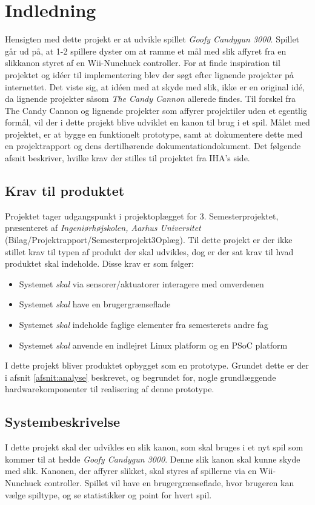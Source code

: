 \chapter{Indledning}
Hensigten med dette projekt er at udvikle spillet \textit{Goofy Candygun 3000}. Spillet går ud på, at 1-2 spillere dyster om at ramme et mål med slik affyret fra en slikkanon styret af en Wii-Nunchuck controller. For at finde inspiration til projektet og idéer til implementering blev der søgt efter lignende projekter på internettet. Det viste sig, at idéen med at skyde med slik, ikke er en original idé, da lignende projekter såsom \textit{The Candy Cannon} \cite{CandyCannon} allerede findes. Til forskel fra The Candy Cannon og lignende projekter som affyrer projektiler uden et egentlig formål, vil der i dette projekt blive udviklet en kanon til brug i et spil. 
Målet med projektet, er at bygge en funktionelt prototype, samt at dokumentere dette med en projektrapport og dens dertilhørende dokumentationdokument. 
Det følgende afsnit beskriver, hvilke krav der stilles til projektet fra IHA's side.

\section{Krav til produktet}
Projektet tager udgangspunkt i projektoplægget for 3. Semesterprojektet, præsenteret af \textit{Ingeniørhøjskolen, Aarhus Universitet} (Bilag/Projektrapport/Semesterprojekt3Oplæg). Til dette projekt er der ikke stillet krav til typen af produkt der skal udvikles, dog er der sat krav til hvad produktet skal indeholde. Disse krav er som følger:

\begin{itemize}
	\item{Systemet \textit{skal} via sensorer/aktuatorer interagere med omverdenen}
	\item{Systemet \textit{skal} have en brugergrænseflade}
	\item{Systemet \textit{skal} indeholde faglige elementer fra semesterets andre fag}
	\item{Systemet \textit{skal} anvende en indlejret Linux platform og en PSoC platform}
\end{itemize}

\noindent I dette projekt bliver produktet opbygget som en prototype. Grundet dette er der i afsnit \ref{afsnit:analyse} beskrevet, og begrundet for, nogle grundlæggende hardwarekomponenter til realisering af denne prototype.


\section{Systembeskrivelse}
\label{afsnit:systembeskrivelse}
I dette projekt skal der udvikles en slik kanon, som skal bruges i et nyt spil som kommer til at hedde \textit{Goofy Candygun 3000}. Denne slik kanon skal kunne skyde med slik. Kanonen, der affyrer slikket, skal styres af spillerne via en Wii-Nunchuck controller. Spillet vil have en brugergrænseflade, hvor brugeren kan vælge spiltype, og se statistikker og point for hvert spil. \newline

